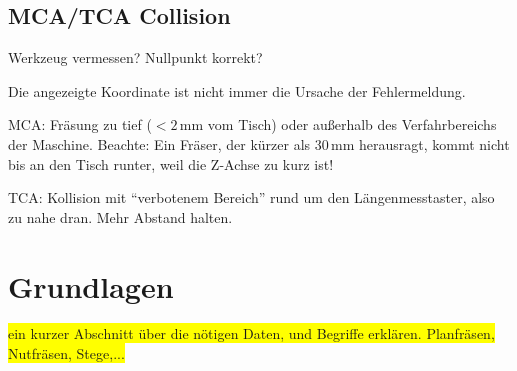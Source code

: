 \documentclass{\basedir/fablab-document}
\renewcommand{\todo}[1]{\colorbox{yellow}{{#1}}}
\begin{document}
\subsection{MCA/TCA Collision}
Werkzeug vermessen? Nullpunkt korrekt?

Die angezeigte Koordinate ist nicht immer die Ursache der Fehlermeldung.

MCA: Fräsung zu tief ($<2$\,mm vom Tisch) oder außerhalb des Verfahrbereichs der Maschine. Beachte: Ein Fräser, der kürzer als 30\,mm herausragt, kommt nicht bis an den Tisch runter, weil die Z-Achse zu kurz ist!

TCA: Kollision mit \enquote{verbotenem Bereich} rund um den Längenmesstaster, also zu nahe dran. Mehr Abstand halten.

\section{Grundlagen}
\todo{ein kurzer Abschnitt über die nötigen Daten, und Begriffe erklären. Planfräsen, Nutfräsen, Stege,...}


\end{document}
